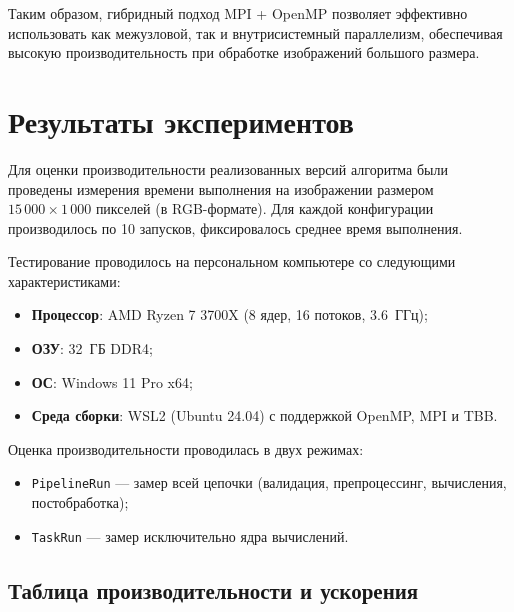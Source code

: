 \documentclass[14pt,a4paper]{extarticle}
\begin{document}
Таким образом, гибридный подход MPI + OpenMP позволяет эффективно использовать как межузловой, так и внутрисистемный параллелизм, 
обеспечивая высокую производительность при обработке изображений большого размера.

\section{Результаты экспериментов}

Для оценки производительности реализованных версий алгоритма были проведены измерения времени выполнения на изображении размером $15\,000 \times 1\,000$ пикселей (в RGB-формате). 
Для каждой конфигурации производилось по 10 запусков, фиксировалось среднее время выполнения.

Тестирование проводилось на персональном компьютере со следующими характеристиками:

\begin{itemize}
    \item \textbf{Процессор}: AMD Ryzen 7 3700X (8 ядер, 16 потоков, 3.6~ГГц);
    \item \textbf{ОЗУ}: 32~ГБ DDR4;
    \item \textbf{ОС}: Windows 11 Pro x64;
    \item \textbf{Среда сборки}: WSL2 (Ubuntu 24.04) с поддержкой OpenMP, MPI и TBB.
\end{itemize}

Оценка производительности проводилась в двух режимах:
\begin{itemize}
    \item \texttt{PipelineRun} — замер всей цепочки (валидация, препроцессинг, вычисления, постобработка);
    \item \texttt{TaskRun} — замер исключительно ядра вычислений.
\end{itemize}

\subsection{Таблица производительности и ускорения}
\end{document}
